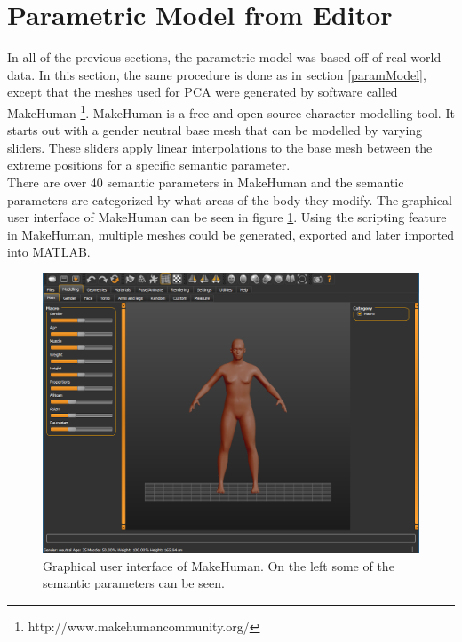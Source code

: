 \section{Parametric Model from Editor}
In all of the previous sections, the parametric model was based off of real world data. In this section, the same procedure is done as in section \ref{paramModel}, except that the meshes used for PCA were generated by software called MakeHuman \footnote{http://www.makehumancommunity.org/}. MakeHuman is a free and open source character modelling tool. It starts out with a gender neutral base mesh that can be modelled by varying sliders. These sliders apply linear interpolations to the base mesh between the extreme positions for a specific semantic parameter.\\
There are over 40 semantic parameters in MakeHuman and the semantic parameters are categorized by what areas of the body they modify. The graphical user interface of MakeHuman can be seen in figure \ref{fig:mhgui}. Using the scripting feature in MakeHuman, multiple meshes could be generated, exported and later imported into MATLAB.

\begin{figure}[h]
\centering
\includegraphics[width=1\textwidth]{figures/mhgui}
\caption[MakeHuman interface]{Graphical user interface of MakeHuman. On the left some of the semantic parameters can be seen.}
\label{fig:mhgui}
\end{figure}

